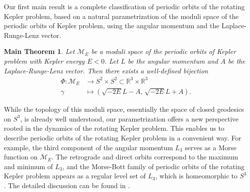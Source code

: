 \documentclass{amsart}
\newcommand{\R}{\mathbb{R}}
\newtheorem{mainthm}{Main Theorem}
\begin{document}
Our first main result is a complete classification of periodic orbits of the rotating Kepler problem, based on a natural parametrization of the moduli space of the periodic orbits of Kepler problem, using the angular momentum and the Laplace-Runge-Lenz vector.
\begin{mainthm}
	Let $\mathcal{M}_E$ be a moduli space of the periodic orbits of Kepler problem with Kepler energy $E<0$.
	Let $L$ be the angular momentum and $A$ be the Laplace-Runge-Lenz vector.
	Then there exists a well-defined bijection
		$$
	\begin{aligned}
		\Phi: \mathcal{M}_E &\to S^2 \times S^2 \subset \R^3\times \R^3 \\
		\gamma &\mapsto \left( \sqrt{-2E} L - A, \, \sqrt{-2E} L + A \right).
	\end{aligned}
	$$
\end{mainthm}
While the topology of this moduli space, essentially the space of closed geodesics on $S^3$, is already well understood, our parametrization offers a new perspective rooted in the dynamics of the rotating Kepler problem.
This enables us to describe periodic orbits of the rotating Kepler problem in a convenient way.
For example, the third component of the angular momentum $L_3$ serves as a Morse function on $\mathcal{M}_E$.
The retrograde and direct orbits correspond to the maximum and minimum of $L_3$, and the Morse-Bott family of periodic orbits of the rotating Kepler problem appears as a regular level set of $L_3$, which is homeomorphic to $S^3$.
The detailed discussion can be found in .
\end{document}

